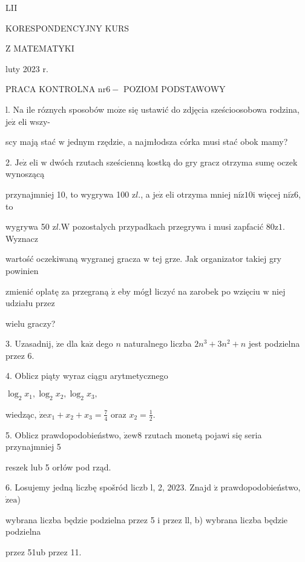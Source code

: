 \documentclass[a4paper,12pt]{article}
\begin{document}
LII

KORESPONDENCYJNY KURS

Z MATEMATYKI

luty 2023 r.

PRACA KONTROLNA $\mathrm{n}\mathrm{r} 6-$ POZIOM PODSTAWOWY

l. Na ile róznych sposobów $\mathrm{m}\mathrm{o}\dot{\mathrm{z}}\mathrm{e}$ się ustawić do zdjęcia sześcioosobowa rodzina, $\mathrm{j}\mathrm{e}\dot{\mathrm{z}}$ eli wszy-

scy mają stać $\mathrm{w}$ jednym rzędzie, a najmłodsza córka musi stać obok mamy?

2. $\mathrm{J}\mathrm{e}\dot{\mathrm{z}}$ eli $\mathrm{w}$ dwóch rzutach sześcienną kostką do gry gracz otrzyma sumę oczek wynoszącą

przynajmniej 10, to wygrywa 100 $\mathrm{z}l.$, a $\mathrm{j}\mathrm{e}\dot{\mathrm{z}}$ eli otrzyma mniej $\mathrm{n}\mathrm{i}\dot{\mathrm{z}} 10\mathrm{i}$ więcej $\mathrm{n}\mathrm{i}\dot{\mathrm{z}}6$, to

wygrywa 50 $\mathrm{z}l. \mathrm{W}$ pozostalych przypadkach przegrywa $\mathrm{i}$ musi zapfacić $80\mathrm{z}1$. Wyznacz

wartość oczekiwaną wygranej gracza $\mathrm{w}$ tej grze. Jak organizator takiej gry powinien

zmienić oplatę za przegraną $\dot{\mathrm{z}}$ eby mógł liczyć na zarobek po wzięciu $\mathrm{w}$ niej udziału przez

wielu graczy?

3. Uzasadnij, $\dot{\mathrm{z}}\mathrm{e}$ dla $\mathrm{k}\mathrm{a}\dot{\mathrm{z}}$ dego $n$ naturalnego liczba $2n^{3}+3n^{2}+n$ jest podzielna przez 6.

4. Oblicz piąty wyraz ciągu arytmetycznego

$\log_{2}x_{1},\log_{2}x_{2},\log_{2}x_{3},$

wiedząc, $\displaystyle \dot{\mathrm{z}}\mathrm{e}x_{1}+x_{2}+x_{3}=\frac{7}{4}$ oraz $x_{2}=\displaystyle \frac{1}{2}.$

5. Oblicz prawdopodobieństwo, $\dot{\mathrm{z}}\mathrm{e}\mathrm{w} 8$ rzutach monetą pojawi się seria przynajmniej 5

reszek lub 5 orłów pod rząd.

6. Losujemy jedną liczbę spošród liczb l, 2, 2023. Znajd $\acute{\mathrm{z}}$ prawdopodobieństwo, $\dot{\mathrm{z}}\mathrm{e} \mathrm{a}$)

wybrana liczba będzie podzielna przez 5 $\mathrm{i}$ przez ll, b) wybrana liczba będzie podzielna

przez 51ub przez 11.
\end{document}

